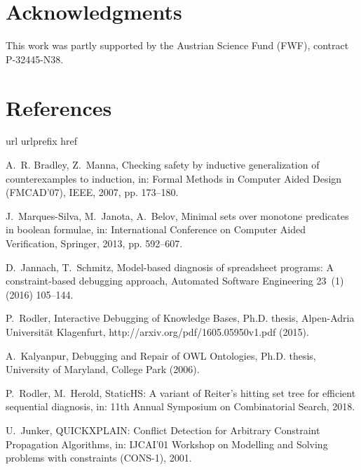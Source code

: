 \documentclass[]{elsarticle}
\begin{document}
	
	
	
	\section*{Acknowledgments}
	This work was partly supported by the Austrian Science Fund (FWF), contract P-32445-N38.  
	
	\section*{References}
	
	\fontsize { 8pt }{ 9pt } 
	\selectfont
	\begin{thebibliography}{10}
		\expandafter\ifx\csname url\endcsname\relax
		\def\url#1{\texttt{#1}}\fi
		\expandafter\ifx\csname urlprefix\endcsname\relax\def\urlprefix{URL }\fi
		\expandafter\ifx\csname href\endcsname\relax
		\def\href#1#2{#2} \def\path#1{#1}\fi
		
		A.~R. Bradley, Z.~Manna, Checking safety by inductive generalization of
		counterexamples to induction, in: Formal Methods in Computer Aided Design
		(FMCAD'07), IEEE, 2007, pp. 173--180.
		
		J.~Marques-Silva, M.~Janota, A.~Belov, Minimal sets over monotone predicates in
		boolean formulae, in: International Conference on Computer Aided
		Verification, Springer, 2013, pp. 592--607.
		
		D.~Jannach, T.~Schmitz, Model-based diagnosis of spreadsheet programs: {A}
		constraint-based debugging approach, Automated Software Engineering 23~(1)
		(2016) 105--144.
		
		P.~Rodler, {Interactive Debugging of Knowledge Bases}, Ph.D. thesis,
		Alpen-Adria Universit\"at Klagenfurt, http://arxiv.org/pdf/1605.05950v1.pdf
		(2015).
		
		A.~Kalyanpur, {Debugging and Repair of OWL Ontologies}, Ph.D. thesis,
		University of Maryland, College Park (2006).
		
		P.~Rodler, M.~Herold, {StaticHS: A variant of Reiter's hitting set tree for
			efficient sequential diagnosis}, in: 11th Annual Symposium on Combinatorial
		Search, 2018.
		
		U.~Junker,
		{{QUICKXPLAIN: Conflict Detection for Arbitrary Constraint Propagation Algorithms}}, in:
		IJCAI'01 Workshop on Modelling and Solving problems with constraints
		(CONS-1), 2001.
		

\end{thebibliography}
\end{document}
